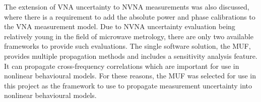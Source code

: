 \documentclass[../thesis/thesis.tex]{subfiles}
\begin{document}
The extension of VNA uncertainty to NVNA measurements was also discussed, where there is a requirement to add the absolute power and phase calibrations to the VNA measurement model. Due to NVNA uncertainty evaluation being relatively young in the field of microwave metrology, there are only two available frameworks to provide such evaluations. The single software solution, the MUF, provides multiple propagation methods and includes a sensitivity analysis feature. It can propagate cross-frequency correlations which are important for use in nonlinear behavioural models. For these reasons, the MUF was selected for use in this project as the framework to use to propagate measurement uncertainty into nonlinear behavioural models.


\end{document}
